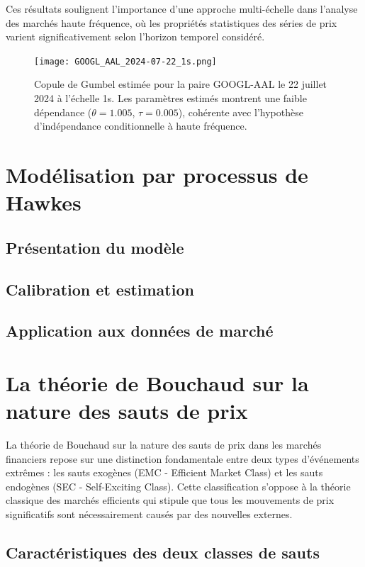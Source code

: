 \documentclass[10pt,a4paper]{article}
\theoremstyle{definition}
\theoremstyle{remark}
\begin{document}
\begin{itemize}
Ces résultats soulignent l'importance d'une approche multi-échelle dans l'analyse des marchés haute fréquence, où les propriétés statistiques des séries de prix varient significativement selon l'horizon temporel considéré.

\begin{figure}[h!]
\centering
    \texttt{[image: GOOGL\_AAL\_2024-07-22\_1s.png]}
    \caption{Copule de Gumbel estimée pour la paire GOOGL-AAL le 22 juillet 2024 à l'échelle 1s. Les paramètres estimés montrent une faible dépendance ($\theta = 1.005$, $\tau = 0.005$), cohérente avec l'hypothèse d'indépendance conditionnelle à haute fréquence.}
    \label{fig:copula_example}
\end{figure}




\newpage
\section{Modélisation par processus de Hawkes}

\subsection{Présentation du modèle}

\subsection{Calibration et estimation}

\subsection{Application aux données de marché}

\newpage
\section{La théorie de Bouchaud sur la nature des sauts de prix}

La théorie de Bouchaud sur la nature des sauts de prix dans les marchés financiers repose sur une distinction fondamentale entre deux types d'événements extrêmes : les sauts exogènes (EMC - Efficient Market Class) et les sauts endogènes (SEC - Self-Exciting Class). Cette classification s'oppose à la théorie classique des marchés efficients qui stipule que tous les mouvements de prix significatifs sont nécessairement causés par des nouvelles externes.

\subsection{Caractéristiques des deux classes de sauts}


\end{itemize}
\end{document}

